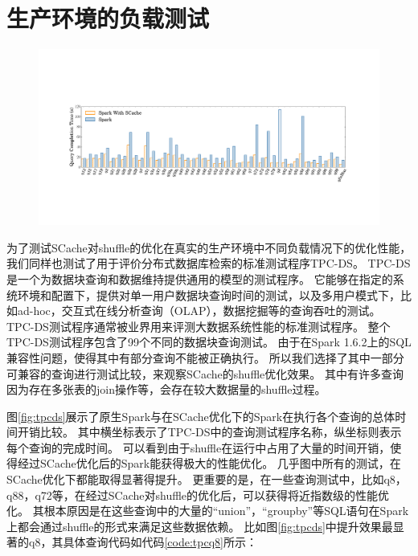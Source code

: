 \section{生产环境的负载测试}

\begin{figure}[!htp]
	\centering
	\includegraphics[width=\textwidth]{../../PPoPP-2018/fig/tpcds.pdf}
\end{figure}

为了测试SCache对shuffle的优化在真实的生产环境中不同负载情况下的优化性能，我们同样也测试了用于评价分布式数据库检索的标准测试程序TPC-DS\cite{tpcds}。
TPC-DS是一个为数据块查询和数据维持提供通用的模型的测试程序。
它能够在指定的系统环境和配置下，提供对单一用户数据块查询时间的测试，以及多用户模式下，比如ad-hoc，交互式在线分析查询（OLAP），数据挖掘等的查询吞吐的测试。
TPC-DS测试程序通常被业界用来评测大数据系统性能的标准测试程序。
整个TPC-DS测试程序包含了99个不同的数据块查询测试。
由于在Spark 1.6.2上的SQL兼容性问题，使得其中有部分查询不能被正确执行。
所以我们选择了其中一部分可兼容的查询进行测试比较，来观察SCache的shuffle优化效果。
其中有许多查询因为存在多张表的join操作等，会存在较大数据量的shuffle过程。

图\ref{fig:tpcds}展示了原生Spark与在SCache优化下的Spark在执行各个查询的总体时间开销比较。
其中横坐标表示了TPC-DS中的查询测试程序名称，纵坐标则表示每个查询的完成时间。
可以看到由于shuffle在运行中占用了大量的时间开销，使得经过SCache优化后的Spark能获得极大的性能优化。
几乎图中所有的测试，在SCache优化下都能取得显著得提升。
更重要的是，在一些查询测试中，比如q8，q88，q72等，在经过SCache对shuffle的优化后，可以获得将近指数级的性能优化。
其根本原因是在这些查询中的大量的“union”，“groupby”等SQL语句在Spark上都会通过shuffle的形式来满足这些数据依赖。
比如图\ref{fig:tpcds}中提升效果最显著的q8，其具体查询代码如代码\ref{code:tpcq8}所示\cite{sparktpcds}：

